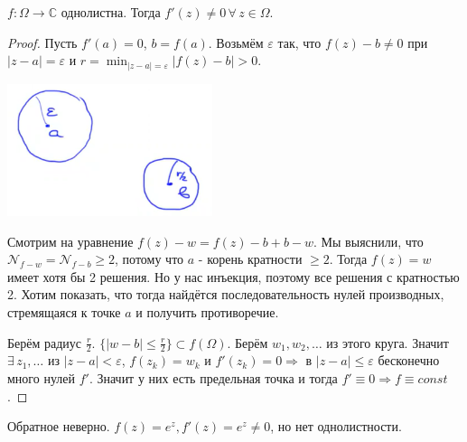 \begin{theorem}
    $f : \Omega \to \mathbb{C}$ однолистна. Тогда $f'(z) \neq 0 \, \forall \, z \in \Omega$.
\end{theorem}

\begin{proof}
    Пусть $f'(a) = 0$, $b = f(a)$. Возьмём $\varepsilon$ так, что
    $f(z) - b \neq 0$ при $|z - a| = \varepsilon$ и $r = \min_{|z - a| = \varepsilon} |f(z) - b| > 0$.

    \begin{center}
        \includegraphics[width=6cm]{assets/04-functions-of-complex-variables/single-leaf-theorem-derivative-none-zero.png}
    \end{center}

    Смотрим на уравнение $f(z) - w = f(z) - b + b - w$. Мы выяснили, что 
    $\mathcal{N}_{f - w} = \mathcal{N}_{f - b} \geqslant 2$, потому что
    $a$ - корень кратности $\geqslant 2$. Тогда $f(z) = w$ имеет хотя бы 2 решения. Но у нас инъекция, поэтому
    все решения с кратностью 2. Хотим показать, что тогда найдётся последовательность нулей производных, 
    стремящаяся к точке $a$ и получить противоречие.

    Берём радиус $\frac{r}{2}$. $\{ |w - b| \leqslant \frac{r}{2} \} \subset f(\Omega)$.
    Берём $w_1, w_2, \ldots$ из этого круга. Значит $\exists \, z_1, \ldots$ из $|z - a| < \varepsilon$, 
    $f(z_k) = w_k$ и $f'(z_k) = 0 \Rightarrow$ в $|z - a| \leqslant \varepsilon$ бесконечно много нулей
    $f'$. Значит у них есть предельная точка и тогда $f' \equiv 0 \Rightarrow f \equiv const$.
\end{proof}

\begin{remark}
    Обратное неверно. $f(z) = e^z, f'(z) = e^z \neq 0$, но нет однолистности.
\end{remark}

